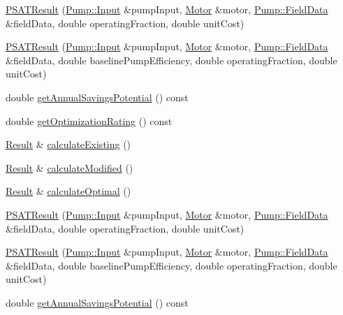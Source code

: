 \begin{DoxyCompactItemize}
\item 
\hyperlink{class_p_s_a_t_result_a17778ac130aac171695917a28ffce312}{P\+S\+A\+T\+Result} (\hyperlink{struct_pump_1_1_input}{Pump\+::\+Input} \&pump\+Input, \hyperlink{struct_motor}{Motor} \&motor, \hyperlink{struct_pump_1_1_field_data}{Pump\+::\+Field\+Data} \&field\+Data, double operating\+Fraction, double unit\+Cost)
\item 
\hyperlink{class_p_s_a_t_result_a33c00a85d9c0fd4e8ba444e1a2ccd591}{P\+S\+A\+T\+Result} (\hyperlink{struct_pump_1_1_input}{Pump\+::\+Input} \&pump\+Input, \hyperlink{struct_motor}{Motor} \&motor, \hyperlink{struct_pump_1_1_field_data}{Pump\+::\+Field\+Data} \&field\+Data, double baseline\+Pump\+Efficiency, double operating\+Fraction, double unit\+Cost)
\item 
double \hyperlink{class_p_s_a_t_result_a14fc75c2e0e92f74e3df1b97ed13b496}{get\+Annual\+Savings\+Potential} () const
\item 
double \hyperlink{class_p_s_a_t_result_aa0a7001461408fcb06a6c22ce2d064db}{get\+Optimization\+Rating} () const
\item 
\hyperlink{struct_p_s_a_t_result_1_1_result}{Result} \& \hyperlink{class_p_s_a_t_result_a83e8e621cdd75e6cf2a4d3f6e48bea11}{calculate\+Existing} ()
\item 
\hyperlink{struct_p_s_a_t_result_1_1_result}{Result} \& \hyperlink{class_p_s_a_t_result_a1404ffd1e9420afd3ff4e9284d145646}{calculate\+Modified} ()
\item 
\hyperlink{struct_p_s_a_t_result_1_1_result}{Result} \& \hyperlink{class_p_s_a_t_result_af8ddf3ade8aaca5724201ee177894d1a}{calculate\+Optimal} ()
\item 
\hyperlink{class_p_s_a_t_result_a17778ac130aac171695917a28ffce312}{P\+S\+A\+T\+Result} (\hyperlink{struct_pump_1_1_input}{Pump\+::\+Input} \&pump\+Input, \hyperlink{struct_motor}{Motor} \&motor, \hyperlink{struct_pump_1_1_field_data}{Pump\+::\+Field\+Data} \&field\+Data, double operating\+Fraction, double unit\+Cost)
\item 
\hyperlink{class_p_s_a_t_result_a33c00a85d9c0fd4e8ba444e1a2ccd591}{P\+S\+A\+T\+Result} (\hyperlink{struct_pump_1_1_input}{Pump\+::\+Input} \&pump\+Input, \hyperlink{struct_motor}{Motor} \&motor, \hyperlink{struct_pump_1_1_field_data}{Pump\+::\+Field\+Data} \&field\+Data, double baseline\+Pump\+Efficiency, double operating\+Fraction, double unit\+Cost)
\item 
double \hyperlink{class_p_s_a_t_result_a14fc75c2e0e92f74e3df1b97ed13b496}{get\+Annual\+Savings\+Potential} () const

\end{DoxyCompactItemize}
